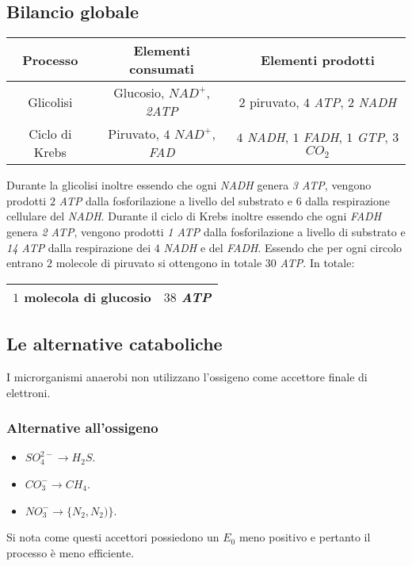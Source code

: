	\subsection{Bilancio globale}
	\begin{center}
		\begin{tabular}{|c|c|c|}
			\hline
			Processo & Elementi consumati & Elementi prodotti \\
			\hline
			Glicolisi & Glucosio, \emph{$NAD^+$}, \emph{2ATP} & $2$ piruvato, $4$ \emph{ATP}, $2$ \emph{NADH} \\
			\hline
			Ciclo di Krebs & Piruvato, $4$ \emph{$NAD^+$}, \emph{FAD} & $4$ \emph{NADH}, $1$ \emph{FADH}, $1$ \emph{GTP}, $3$ \emph{$CO_2$} \\
			\hline
		\end{tabular}
	\end{center}
	Durante la glicolisi inoltre essendo che ogni \emph{NADH} genera \emph{3 ATP}, vengono prodotti $2$ \emph{ATP} dalla fosforilazione a livello del substrato e $6$ dalla respirazione cellulare del \emph{NADH}.
	Durante il ciclo di Krebs inoltre essendo che ogni \emph{FADH} genera \emph{2 ATP}, vengono prodotti \emph{1 ATP} dalla fosforilazione a livello di substrato e \emph{14 ATP} dalla respirazione
	dei $4$ \emph{NADH} e del \emph{FADH}.
	Essendo che per ogni circolo entrano $2$ molecole di piruvato si ottengono in totale $30$ \emph{ATP}.
	In totale:
	\begin{center}
		\begin{tabular}{|c|c|}
			\hline
			$1$ molecola di glucosio & $38$ \emph{ATP}\\
			\hline
		\end{tabular}
	\end{center}

	\subsection{Le alternative cataboliche}
	I microrganismi anaerobi non utilizzano l'ossigeno come accettore finale di elettroni.
		
		\subsubsection{Alternative all'ossigeno}
		\begin{multicols}{3}
			\begin{itemize}
				\item \emph{$SO_4^{2-}\rightarrow H_2S$}.
				\item \emph{$CO_3^- \rightarrow CH_4$}.
				\item \emph{$NO_3^-\rightarrow \{N_2, N_2)\}$}.
			\end{itemize}
		\end{multicols}
		Si nota come questi accettori possiedono un $E_0$ meno positivo e pertanto il processo \`e meno efficiente.

